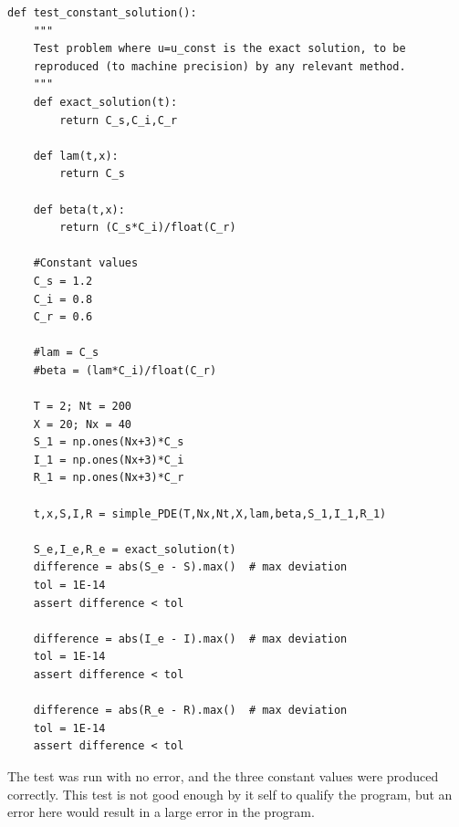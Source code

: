 \documentclass[%
twoside,                 %
final,                   %
10pt]{article}
\begin{document}
\begin{Verbatim}[numbers=none,fontsize=\fontsize{9pt}{9pt},baselinestretch=0.95]
def test_constant_solution():
    """
    Test problem where u=u_const is the exact solution, to be
    reproduced (to machine precision) by any relevant method.
    """
    def exact_solution(t):
        return C_s,C_i,C_r
    
    def lam(t,x):
        return C_s

    def beta(t,x):
        return (C_s*C_i)/float(C_r)

    #Constant values
    C_s = 1.2
    C_i = 0.8
    C_r = 0.6
    
    #lam = C_s
    #beta = (lam*C_i)/float(C_r)
    
    T = 2; Nt = 200
    X = 20; Nx = 40
    S_1 = np.ones(Nx+3)*C_s
    I_1 = np.ones(Nx+3)*C_i
    R_1 = np.ones(Nx+3)*C_r
    
    t,x,S,I,R = simple_PDE(T,Nx,Nt,X,lam,beta,S_1,I_1,R_1)
    
    S_e,I_e,R_e = exact_solution(t)
    difference = abs(S_e - S).max()  # max deviation
    tol = 1E-14
    assert difference < tol

    difference = abs(I_e - I).max()  # max deviation
    tol = 1E-14
    assert difference < tol

    difference = abs(R_e - R).max()  # max deviation
    tol = 1E-14
    assert difference < tol
\end{Verbatim}

The test was run with no error, and the three constant values were produced correctly. This test is not good enough by it self to qualify the program, but an error here would result in a large error in the program. 
\end{document}
